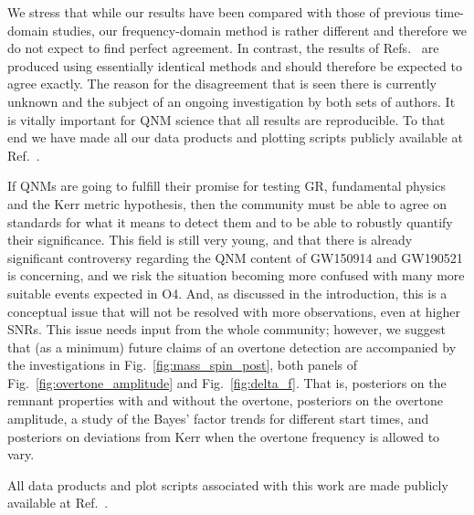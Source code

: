 We stress that while our results have been compared with those of previous time-domain studies, our frequency-domain method is rather different and therefore we do not expect to find perfect agreement. 
In contrast, the results of Refs.~\cite{Isi:2019aib, Cotesta:2022pci, Isi:2022mhy} are produced using essentially identical methods and should therefore be expected to agree exactly. 
The reason for the disagreement that is seen there is currently unknown and the subject of an ongoing investigation by both sets of authors.
It is vitally important for QNM science that all results are reproducible. To that end we have made all our data products and plotting scripts publicly available at Ref.~\cite{finch_eliot_2022_6949492}.

If QNMs are going to fulfill their promise for testing GR, fundamental physics and the Kerr metric hypothesis, then the community must be able to agree on standards for what it means to detect them and to be able to robustly quantify their significance. 
This field is still very young, and that there is already significant controversy regarding the QNM content of GW150914 and GW190521 is concerning, and we risk the situation becoming more confused with many more suitable events expected in O4.
And, as discussed in the introduction, this is a conceptual issue that will not be resolved with more observations, even at higher SNRs.
This issue needs input from the whole community; however, we suggest that (as a minimum) future claims of an overtone detection are accompanied by the investigations in Fig.~\ref{fig:mass_spin_post}, both panels of Fig.~\ref{fig:overtone_amplitude} and Fig.~\ref{fig:delta_f}.
That is, posteriors on the remnant properties with and without the overtone, posteriors on the overtone amplitude, a study of the Bayes' factor trends for different start times, and posteriors on deviations from Kerr when the overtone frequency is allowed to vary.

All data products and plot scripts associated with this work are made publicly available at Ref.~\cite{finch_eliot_2022_6949492}.
